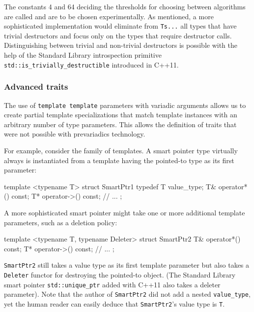 \noindent The constants 4 and 64 deciding the thresholds for choosing between
algorithms are called  and are to be chosen
experimentally. As mentioned, a more sophisticated implementation would
eliminate from \lstinline!Ts...! all types that have trivial destructors
and focus only on the types that require destructor calls.
Distinguishing between trivial and non-trivial destructors is possible
with the help of the Standard Library introspection primitive
\lstinline!std::is_trivially_destructible! introduced in C++11.

\subsubsection[Advanced traits]{Advanced traits}\label{advanced-traits}

The use of \lstinline!template!~\lstinline!template! parameters with variadic
arguments allows us to create partial template specializations that
match template instances with an arbitrary number of type parameters.
This allows the definition of traits that were not possible with
prevariadics technology.

For example, consider the family of  templates. A
smart pointer type virtually always is instantiated from a template
having the pointed-to type as its first parameter:

\begin{emcppslisting}[emcppsbatch=e40]
template <typename T>
struct SmartPtr1
{
    typedef T value_type;
    T& operator*() const;
    T* operator->() const;
    // ...
};
\end{emcppslisting}
    

\noindent A more sophisticated smart pointer might take one or more additional
template parameters, such as a deletion policy:

\begin{emcppslisting}[emcppsbatch=e40]
template <typename T, typename Deleter>
struct SmartPtr2
{
    T& operator*() const;
    T* operator->() const;
    // ...
};
\end{emcppslisting}
    

\noindent \lstinline!SmartPtr2! still takes a value type as its first template
parameter but also takes a \lstinline!Deleter! functor for destroying the
pointed-to object. (The Standard Library smart pointer\linebreak%
\lstinline!std::unique_ptr! added with C++11 also takes a deleter
parameter). Note that the author of \lstinline!SmartPtr2! did not add a
nested \lstinline!value_type!, yet the human reader can easily deduce that
\lstinline!SmartPtr2!'s value type is \lstinline!T!.

